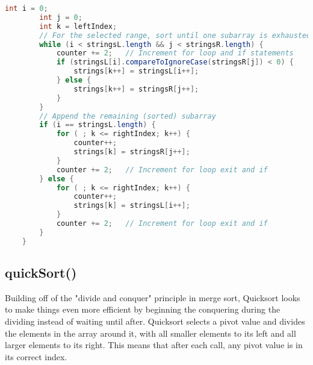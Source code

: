 \documentclass[letterpaper, 10pt]{article}
\begin{document}
\begin{lstlisting}[language=Java, firstnumber=80]
        int i = 0;
        int j = 0;
        int k = leftIndex;
        // For the selected range, sort until one subarray is exhausted
        while (i < stringsL.length && j < stringsR.length) {
            counter += 2;   // Increment for loop and if statements
            if (stringsL[i].compareToIgnoreCase(stringsR[j]) < 0) {
                strings[k++] = stringsL[i++];
            } else {
                strings[k++] = stringsR[j++];
            }
        }
        // Append the remaining (sorted) subarray
        if (i == stringsL.length) {
            for ( ; k <= rightIndex; k++) {
                counter++;
                strings[k] = stringsR[j++];
            }
            counter += 2;   // Increment for loop exit and if
        } else {
            for ( ; k <= rightIndex; k++) {
                counter++;
                strings[k] = stringsL[i++];
            }
            counter += 2;   // Increment for loop exit and if
        }
    }
\end{lstlisting}

\vspace{1.0em}

\subsection{quickSort()}

\hspace{1.0em}Building off of the "divide and conquer" principle in merge sort, Quicksort looks to make things even more efficient by beginning the conquering during the dividing instead of waiting until after. Quicksort selects a pivot value and divides the elements in the array around it, with all smaller elements to its left and all larger elements to its right. This means that after each call, any pivot value is in its correct index.

\vspace{2.0em}
\end{document}
